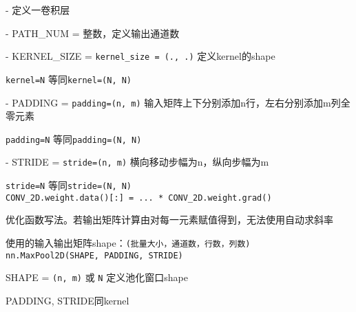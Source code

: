 \documentclass[UTF8]{ctexart}
\begin{document}
  - 定义一卷积层

  - PATH\_NUM = 整数，定义输出通道数

  - KERNEL\_SIZE = \texttt{kernel\_size = (., .)} 定义kernel的shape

  \quad \texttt{kernel=N} 等同\texttt{kernel=(N, N)}
  
  - PADDING = \texttt{padding=(n, m)}  输入矩阵上下分别添加n行，左右分别添加m列全零元素

  \quad \texttt{padding=N} 等同\texttt{padding=(N, N)}
  
  - STRIDE = \texttt{stride=(n, m)} 横向移动步幅为n，纵向步幅为m
  
  \quad \texttt{stride=N} 等同\texttt{stride=(N, N)}\\
\texttt{CONV\_2D.weight.data()[:] = ... * CONV\_2D.weight.grad()}

  优化函数写法。若输出矩阵计算由对每一元素赋值得到，无法使用自动求斜率
  
  使用的输入输出矩阵shape：\texttt{(批量大小，通道数，行数，列数)}\\
\texttt{nn.MaxPool2D(SHAPE, PADDING, STRIDE)}

  SHAPE = \texttt{(n, m)} 或 \texttt{N} 定义池化窗口shape

  PADDING, STRIDE同kernel
\end{document}
